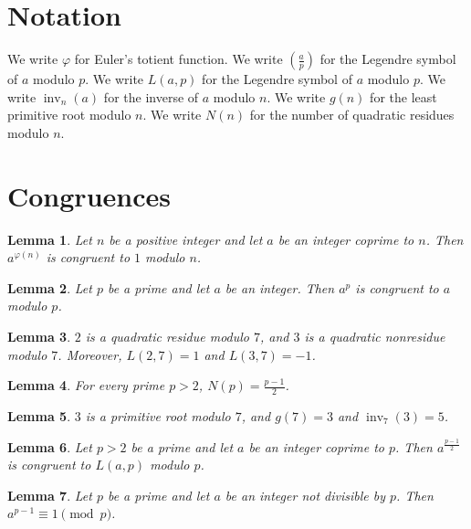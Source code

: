 \documentclass{article}
\newtheorem{lemma}{Lemma}
\begin{document}
\section{Notation}

We write $\varphi$ for Euler's totient function.
We write $\left(\frac{a}{p}\right)$ for the Legendre symbol of $a$ modulo $p$.
We write $L(a,p)$ for the Legendre symbol of $a$ modulo $p$.
We write $\operatorname{inv}_n(a)$ for the inverse of $a$ modulo $n$.
We write $g(n)$ for the least primitive root modulo $n$.
We write $N(n)$ for the number of quadratic residues modulo $n$.

\section{Congruences}

\begin{lemma}\label{euler}
Let $n$ be a positive integer and let $a$ be an integer coprime to $n$. Then $a^{\varphi(n)}$ is congruent to $1$ modulo $n$.
\end{lemma}

\begin{lemma}\label{fermat}
Let $p$ be a prime and let $a$ be an integer. Then $a^p$ is congruent to $a$ modulo $p$.
\end{lemma}

\begin{lemma}\label{residues}
$2$ is a quadratic residue modulo $7$, and $3$ is a quadratic nonresidue modulo $7$. Moreover, $L(2,7)=1$ and $L(3,7)=-1$.
\end{lemma}

\begin{lemma}\label{count}
For every prime $p>2$, $N(p)=\frac{p-1}{2}$.
\end{lemma}

\begin{lemma}\label{roots}
$3$ is a primitive root modulo $7$, and $g(7)=3$ and $\operatorname{inv}_7(3)=5$.
\end{lemma}

\begin{lemma}\label{criterion}
Let $p>2$ be a prime and let $a$ be an integer coprime to $p$. Then $a^{\frac{p-1}{2}}$ is congruent to $L(a,p)$ modulo $p$.
\end{lemma}

\begin{lemma}\label{fermat-little}
Let $p$ be a prime and let $a$ be an integer not divisible by $p$. Then $a^{p-1}\equiv1\pmod p$.
\end{lemma}
\end{document}
